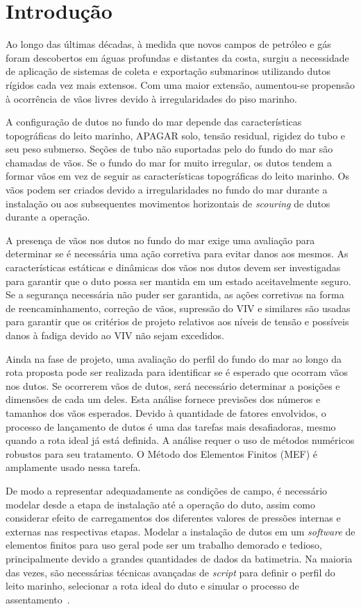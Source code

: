 \chapter{Introdução}


Ao longo das últimas décadas, à medida que novos campos de petróleo e gás foram descobertos em águas profundas e distantes da costa, surgiu a necessidade de aplicação de sistemas de coleta e exportação submarinos utilizando dutos rígidos cada vez mais extensos.
Com uma maior extensão, aumentou-se propensão à ocorrência de vãos livres devido à irregularidades do piso marinho.

A configuração de dutos no fundo do mar depende das características topográficas do leito marinho, APAGAR solo, tensão residual, rigidez do tubo e seu peso submerso.
Seções de tubo não suportadas pelo do fundo do mar são chamadas de vãos.
Se o fundo do mar for muito irregular, os dutos tendem a formar vãos em vez de seguir as características topográficas do leito marinho.
Os vãos podem ser criados devido a irregularidades no fundo do mar durante a instalação ou aos subsequentes movimentos horizontais de \textit{scouring} de dutos durante a operação.

A presença de vãos nos dutos no fundo do mar exige uma avaliação para determinar se é necessária uma ação corretiva para evitar danos aos mesmos.
As características estáticas e dinâmicas dos vãos nos dutos devem ser investigadas para garantir que o duto possa ser mantida em um estado aceitavelmente seguro.
Se a segurança necessária não puder ser garantida, as ações corretivas na forma de reencaminhamento, correção de vãos, supressão do VIV e similares são usadas para garantir que os critérios de projeto relativos aos níveis de tensão e possíveis danos à fadiga devido ao VIV não sejam excedidos.

Ainda na fase de projeto, uma avaliação do perfil do fundo do mar ao longo da rota proposta pode ser realizada para identificar se é esperado que ocorram vãos nos dutos.
Se ocorrerem vãos de dutos, será necessário determinar a posições e dimensões de cada um deles.
Esta análise fornece previsões dos números e tamanhos dos vãos esperados.
Devido à quantidade de fatores envolvidos, o processo de lançamento de dutos é uma das tarefas mais desafiadoras, mesmo quando a rota ideal já está definida.
A análise requer o uso de métodos numéricos robustos para seu tratamento.
O Método dos Elementos Finitos (MEF) é amplamente usado nessa tarefa.

De modo a representar adequadamente as condições de campo, é necessário modelar desde a etapa de instalação até a operação do duto, assim como considerar efeito de carregamentos dos diferentes valores de pressões internas e externas nas respectivas etapas.
Modelar a instalação de dutos em um \textit{software} de elementos finitos para uso geral pode ser um trabalho demorado e tedioso, principalmente devido a grandes quantidades de dados da batimetria.
Na maioria das vezes, são necessárias técnicas avançadas de \textit{script} para definir o perfil do leito marinho, selecionar a rota ideal do duto e simular o processo de assentamento~\cite{VandenAbeele2013}.

